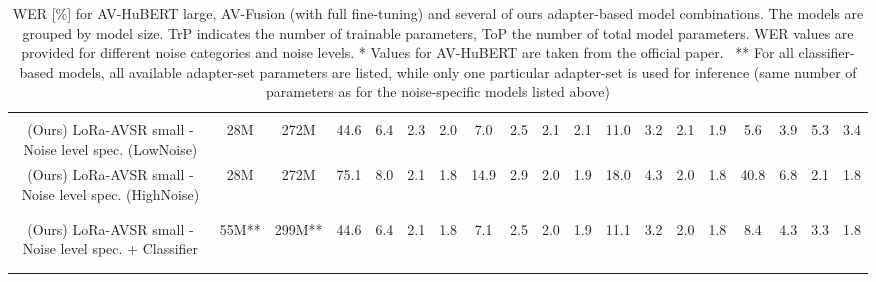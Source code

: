 \begin{table*}[ht]
{\begin{tabular}{c|cc|cccc|cccc|cccc|cccc}
\\[-0.6em]
\hline
\\[-0.6em]


(Ours) LoRa-AVSR small - Noise level spec. (LowNoise) & 
28M & 272M & \cellcolor{gray!20}44.6 & \cellcolor{gray!20}6.4 & 2.3 & 2.0 & \cellcolor{gray!20}7.0 & \cellcolor{gray!20}2.5 & 2.1 & 2.1 & \cellcolor{gray!20}11.0 & \cellcolor{gray!20}3.2 & 2.1 & 1.9 & \cellcolor{gray!20}5.6 & \cellcolor{gray!20}3.9 & 5.3 & 3.4 \\
(Ours) LoRa-AVSR small - Noise level spec. (HighNoise) & 
28M & 272M & 75.1 & 8.0 & \cellcolor{gray!20}2.1 & \cellcolor{gray!20}1.8 & 14.9 & 2.9 & \cellcolor{gray!20}2.0 & \cellcolor{gray!20}1.9 & 18.0 & 4.3 & \cellcolor{gray!20}2.0 & \cellcolor{gray!20}1.8 & 40.8 & 6.8 & \cellcolor{gray!20}2.1 & \cellcolor{gray!20}1.8\\

\\[-0.85em]
\hdashline
\\[-0.85em]

(Ours) LoRa-AVSR small - Noise level spec. + Classifier & 
55M** & 299M** & \cellcolor{blue!15}44.6 & \cellcolor{blue!15}6.4 & \cellcolor{blue!15}2.1 & \cellcolor{blue!15}1.8 & \cellcolor{blue!15}7.1 & \cellcolor{blue!15}2.5 & \cellcolor{blue!15}2.0 & \cellcolor{blue!15}1.9 & \cellcolor{blue!15}11.1 & \cellcolor{blue!15}3.2 & \cellcolor{blue!15}2.0 & \cellcolor{blue!15}1.8 & \cellcolor{blue!15}8.4 & \cellcolor{blue!15}4.3 & \cellcolor{blue!15}3.3 & \cellcolor{blue!15}1.8 \\

\\[-0.5em]
\bottomrule
\\[-0.5em]

\end{tabular}
}
\caption{
WER [\%] for AV-HuBERT large, AV-Fusion (with full fine-tuning) and several of ours adapter-based model combinations. The models are grouped by model size. TrP indicates the number of trainable parameters, ToP the number of total model parameters. WER values are provided for different noise categories and noise levels. * Values for AV-HuBERT are taken from the official paper.~\cite{AVSR_robust_ssAVSR_avhubert2_2022} ** For all classifier-based models, all available adapter-set parameters are listed, while only one particular adapter-set is used for inference (same number of parameters as for the noise-specific models listed above)}
\label{tab:res}
\end{table*}
